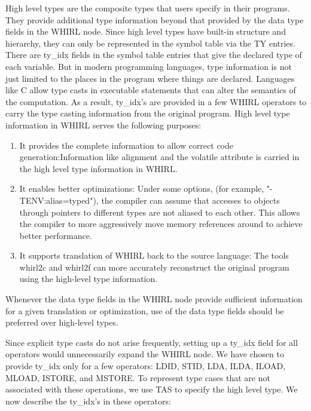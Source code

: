 \documentclass{article}
\begin{document}
High level types are the composite types that users specify in
their programs. They provide additional type information beyond
that provided by the data type fields in the WHIRL node. Since high
level types have built-in structure and hierarchy, they can only
be represented in the symbol table via the TY entries. There are
ty\_idx fields in the symbol table entries that give the declared
type of each variable. But in modern programming languages, type
information is not just limited to the places in the program where
things are declared. Languages like C allow type casts in executable
statements that can alter the semantics of the computation. As
a result, ty\_idx's are provided in a few WHIRL operators to carry
the type
casting information from the original program. High level type
information in WHIRL serves the following purposes: 

\begin{enumerate}
\item It provides
the complete information to allow correct code generation:Information
like alignment and the volatile attribute is carried in the high
level type information in WHIRL. 
\item It enables better optimizations:
Under some options, (for example, "-TENV:alias=typed"), the compiler
can assume that accesses to objects through pointers to different
types are not aliased to each other. This allows the compiler to
more aggressively move memory references around to achieve better
performance. 
\item It supports translation of WHIRL back to the source
language: The tools whirl2c and whirl2f can more accurately reconstruct
the original program using the high-level type information. 
\end{enumerate}

Whenever the data type fields in the WHIRL node provide sufficient information
for a given translation or optimization, use of the data type fields
should be preferred over high-level types. 

Since explicit type casts do not arise frequently, setting up a
ty\_idx field for all operators would unnecessarily expand the WHIRL
node. We have chosen to provide ty\_idx only for a few operators:
%
LDID,
%
STID,
%
LDA,
%
ILDA,
%
ILOAD,
%
MLOAD,
%
ISTORE, and
%
MSTORE. To represent
type cases that are not associated with these operations, we use
TAS to specify the high level type. We now describe the ty\_idx's in
these operators:
\end{document}
